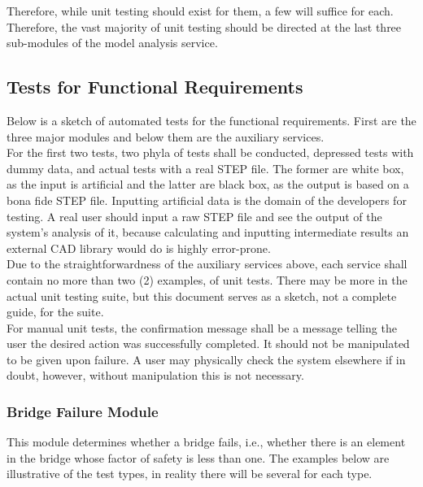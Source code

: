 \documentclass[12pt, titlepage]{article}
\begin{document}
  Therefore, while unit testing should exist for them, a few will suffice for each. 
  Therefore, the vast majority of unit testing should
  be directed at the last three sub-modules of the model analysis service.

\subsection{Tests for Functional Requirements}



  Below is a sketch of automated tests for the functional requirements. 
  First are the three major modules and below them are the auxiliary services. \\

  For the first two tests, two phyla of tests shall be conducted, depressed tests with dummy data,
  and actual tests with a real STEP file. The former are white box, as the input is artificial 
  and the latter are black box, as the output is based on a bona fide STEP file. Inputting artificial data
  is the domain of the developers for testing. A real user should input a raw STEP file and see the output
  of the system's analysis of it, because calculating and inputting intermediate results an external
  CAD library would do is highly error-prone. \\

  Due to the straightforwardness of the auxiliary services above, each service shall contain no more than two (2) examples, 
  of unit tests. There may be more in the actual unit testing suite, but this document serves as a sketch, not
  a complete guide, for the suite. \\

  For manual unit tests, the confirmation message shall be a message telling the user the desired action was successfully completed.
  It should not be manipulated to be given upon failure. A user may physically check the system elsewhere if in doubt, however, without manipulation this is not necessary.



\subsubsection{Bridge Failure Module}


This module determines whether a bridge fails, i.e., whether there is an element in the bridge whose
factor of safety is less than one. The examples below are illustrative of the test types, in reality
there will be several for each type.
\end{document}
